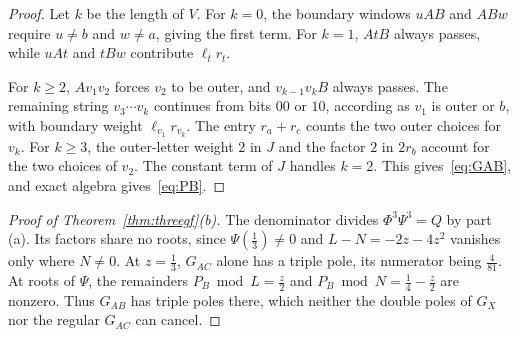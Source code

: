 \begin{proof}
Let $k$ be the length of $V$. For $k=0$, the boundary windows
$uAB$ and $ABw$ require $u\ne b$ and $w\ne a$, giving the first term.
For $k=1$, $AtB$ always passes, while $uAt$ and $tBw$ contribute
$\ell_tr_t$.

For $k\ge2$, $Av_1v_2$ forces $v_2$ to be outer, and
$v_{k-1}v_kB$ always passes. The remaining string $v_3\cdots v_k$
continues from bits $00$ or $10$, according as $v_1$ is outer or $b$,
with boundary weight $\ell_{v_1}r_{v_k}$. The entry $r_a+r_c$
counts the two outer choices for $v_k$. For $k\ge3$, the outer-letter
weight $2$ in $J$ and the factor $2$ in $2r_b$ account for the two choices of $v_2$. The constant term of $J$ handles
$k=2$. This gives~\eqref{eq:GAB}, and exact algebra gives~\eqref{eq:PB}.
\end{proof}

\begin{proof}[Proof of Theorem~\ref{thm:threegf}(b)]
The denominator divides $\Phi^3\Psi^3=Q$ by part (a).
Its factors share no roots, since $\Psi(\frac13)\ne0$ and
$L-N=-2z-4z^2$ vanishes only where $N\ne0$.
At $z=\frac13$, $G_{AC}$ alone has a triple pole, its numerator
being $\frac4{81}$. At roots of $\Psi$, the remainders
$P_B\bmod L=\frac z2$ and $P_B\bmod N=\frac14-\frac z2$
are nonzero. Thus $G_{AB}$ has triple poles there, which neither
the double poles of $G_X$ nor the regular $G_{AC}$ can cancel.
\end{proof}

